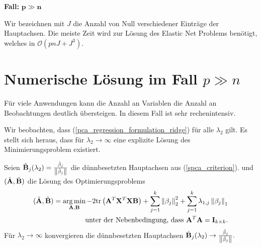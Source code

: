 \textbf{Fall: } $\mathbf{p \gg n}$

Wir bezeichnen mit $J$ die Anzahl von Null verschiedener Einträge der Hauptachsen. Die meiste Zeit wird zur Lösung des Elastic Net Problems benötigt, welches in $\mathcal{O}(pnJ + J^3)$.


\section{Numerische Lösung im Fall $p \gg n$}

Für viele Anwendungen kann die Anzahl an Variablen die Anzahl an Beobachtungen deutlich übersteigen. In diesem Fall ist sehr rechenintensiv.

Wir beobachten, dass (\ref{pca_regression_formulation_ridge}) für alle $\lambda_2$ gilt. Es stellt sich heraus, dass für $\lambda_2 \to \infty$ eine explizite Lösung des Minimierungsproblem existiert.
\begin{thm} \label{spca_p_greater_n}
Seien $\hat{\mathbf{B}}_j(\lambda_2) = \frac{\hat{\beta}_j}{\left\lVert \hat{\beta}_j \right\rVert}$ die dünnbesetzten Hauptachsen aus (\ref{spca_criterion}).
und $(\tilde{\mathbf{A}}, \tilde{\mathbf{B}})$ die Lösung des Optimierungsproblems
\begin{align}
\label{spca_p_greater_n_problem}
\begin{split}
(\tilde{\mathbf{A}}, \tilde{\mathbf{B}}) = \operatorname*{arg\,min}_{\mathbf{A}, \mathbf{B}} -2\text{tr} \left( \mathbf{A}^T\mathbf{X}^T\mathbf{X} \mathbf{B} \right) + \sum_{j=1}^k \left\lVert \beta_j \right\rVert_2^2 + \sum_{j=1}^k \lambda_{1,j}\left\lVert \beta_j \right\rVert_1\\
\text{unter der Nebenbedingung, dass } \mathbf{A}^T \mathbf{A} = \mathbf{I}_{k \times k}.
\end{split}
\end{align}
Für $\lambda_2 \to \infty$ konvergieren die dünnbesetzten Hauptachsen $\hat{\mathbf{B}}_j(\lambda_2) \to \frac{\tilde{\beta}_j}{\left\lVert \tilde{\beta}_j \right\rVert}.$
\end{thm}

